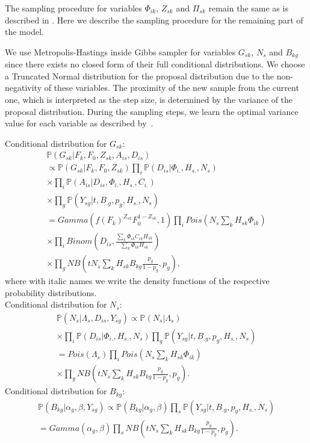 \documentclass[unnumsec,webpdf,contemporary,large]{oup-authoring-template}%
\theoremstyle{thmstyleone}%
\theoremstyle{thmstyletwo}%
\theoremstyle{thmstylethree}%
\begin{document}
\begin{methods}
The sampling procedure for variables $\Phi_{ik}$, $Z_{sk}$ and $\Pi_{sk}$ remain the same as is described in \cite{shafighi2024integrative}. Here we describe the sampling procedure for the remaining part of the model. 

We use Metropolis-Hastings inside Gibbs sampler for variables  $G_{sk}$, $N_s$ and $B_{kg}$ since there exists no closed form of their full conditional distributions. We choose a Truncated Normal distribution for the proposal distribution due to the non-negativity of these variables. 
The proximity of the new sample from the current one, which is interpreted as the step size, is determined by the variance of the proposal distribution. During the sampling steps, we learn the optimal variance value for each variable as described by~\cite{shafighi2024integrative}. 


Conditional distribution for $G_{sk}$:
\begin{multline*}
\mathbb{P}(G_{sk}|F_k,F_0,Z_{sk}, A_{is}, D_{is})\\
\propto \mathbb{P}(G_{sk}|F_k,F_0,Z_{sk})\prod_i \mathbb{P}(D_{is}|\Phi_{i.},H_{s.},N_s) \\ \times \prod_i\mathbb{P}(A_{is}|D_{is},\Phi_{i.},H_{s.},C_{i.})
\\ \times \prod_g \mathbb{P}(Y_{sg}|t, B_{.g},p_g,H_{s.},N_s)\\
= Gamma({f(F_{k})}^{Z_{sk}}F_{0}^{1-Z_{sk}},1) \prod_i Pois (N_s\sum_{k}{H_{sk}\Phi_{ik}}) \\ \times \prod_i Binom (D_{is},\frac{\sum_{k}\Phi_{ik}C_{ik}H_{sk}}{\sum_{k}\Phi_{ik}H_{sk}}) \\ \times \prod_g NB(t N_s\sum_{k}{H_{sk}B_{kg}}\frac{p_g}{1-p_g},p_g),
\end{multline*}
where with italic names we write the density functions of the respective probability distributions.\\
Conditional distribution for $N_{s}$:
\begin{multline*}
\mathbb{P}(N_{s}|\Lambda_s, D_{is}, Y_{sg})
\propto \mathbb{P}(N_{s}|\Lambda_s) \\ \times \prod_i\mathbb{P}(D_{is}|\Phi_{i.},H_{s.},N_s) 
 \prod_g \mathbb{P}(Y_{sg}|t, B_{.g},p_g,H_{s.},N_s)\\
=Pois(\Lambda_s)\prod_i Pois (N_s\sum_{k}{H_{sk}\Phi_{ik}})\\ \times \prod_g NB(t N_s\sum_{k}{H_{sk}B_{kg}}\frac{p_g}{1-p_g},p_g).
\end{multline*}
Conditional distribution for $B_{kg}$:
\begin{multline*}
\mathbb{P}(B_{kg}|\alpha_g, \beta, Y_{sg})
\propto \mathbb{P}(B_{kg}|\alpha_g, \beta) \prod_s \mathbb{P}(Y_{sg}|t, B_{.g},p_g,H_{s.},N_s)\\
= Gamma(\alpha_{g},\beta) \prod_s NB(t N_s \sum_{k}{H_{sk}B_{kg}}\frac{p_g}{1-p_g},p_g).
\end{multline*}



\end{methods}
\end{document}
